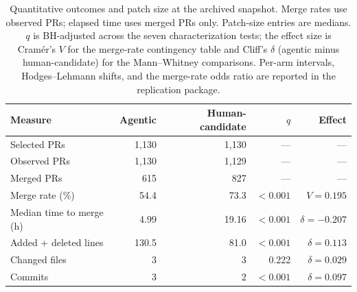 \begin{table}[htbp]
\centering
\small
\caption{Quantitative outcomes and patch size at the archived snapshot. Merge rates use observed PRs; elapsed time uses merged PRs only. Patch-size entries are medians. $q$ is BH-adjusted across the seven characterization tests; the effect size is Cram\'er's $V$ for the merge-rate contingency table and Cliff's $\delta$ (agentic minus human-candidate) for the Mann--Whitney comparisons. Per-arm intervals, Hodges--Lehmann shifts, and the merge-rate odds ratio are reported in the replication package.}
\label{tab:quantitative-outcomes}
\begin{tabular}{lrrrr}
\toprule
Measure & Agentic & Human-candidate & $q$ & Effect \\
\midrule
Selected PRs & 1,130 & 1,130 & --- & --- \\
Observed PRs & 1,130 & 1,129 & --- & --- \\
Merged PRs & 615 & 827 & --- & --- \\
Merge rate (\%) & 54.4 & 73.3 & $<0.001$ & $V=0.195$ \\
Median time to merge (h) & 4.99 & 19.16 & $<0.001$ & $\delta=-0.207$ \\
Added + deleted lines & 130.5 & 81.0 & $<0.001$ & $\delta=0.113$ \\
Changed files & 3 & 3 & 0.222 & $\delta=0.029$ \\
Commits & 3 & 2 & $<0.001$ & $\delta=0.097$ \\
\bottomrule
\end{tabular}
\end{table}
